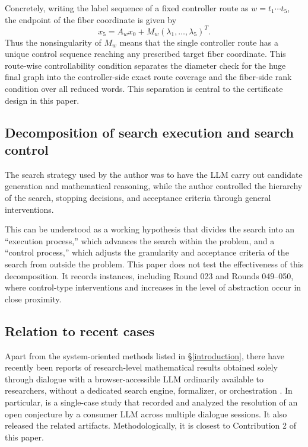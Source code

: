 \documentclass[11pt]{article}
\theoremstyle{definition}
\theoremstyle{remark}
\renewcommand{\_}{\textunderscore\allowbreak}
\begin{document}
Concretely, writing the label sequence of a fixed controller route as
\(w=t_1\cdots t_5\), the endpoint of the fiber coordinate is given by \[
  x_5=A_wx_0+
  M_w(\lambda_1,\ldots,\lambda_5)^T .
\] Thus the nonsingularity of \(M_w\) means that the single controller
route has a unique control sequence reaching any prescribed target fiber
coordinate. This route-wise controllability condition separates the
diameter check for the huge final graph into the controller-side exact
route coverage and the fiber-side rank condition over all reduced words.
This separation is central to the certificate design in this paper.

\subsection{Decomposition of search execution and search
control}\label{decomposition-of-search-execution-and-search-control}

The search strategy used by the author was to have the LLM carry out
candidate generation and mathematical reasoning, while the author
controlled the hierarchy of the search, stopping decisions, and
acceptance criteria through general interventions.

This can be understood as a working hypothesis that divides the search
into an ``execution process,'' which advances the search within the
problem, and a ``control process,'' which adjusts the granularity and
acceptance criteria of the search from outside the problem. This paper
does not test the effectiveness of this decomposition. It records
instances, including Round 023 and Rounds 049--050, where control-type
interventions and increases in the level of abstraction occur in close
proximity.

\subsection{Relation to recent
cases}\label{relation-to-recent-cases}

Apart from the system-oriented methods listed in \S\ref{introduction}, there have recently
been reports of research-level mathematical results obtained solely
through dialogue with a browser-accessible LLM ordinarily available to
researchers, without a dedicated search engine, formalizer, or
orchestration \cite{Bubeck2025, Salim2025, Verbeken2026, Gowers2026,
Howlett2026}. In particular, \cite{Verbeken2026} is a single-case study
that recorded and analyzed the resolution of an open conjecture by a
consumer LLM across multiple dialogue sessions. It also released the
related artifacts. Methodologically, it is closest to Contribution 2 of
this paper.
\end{document}
